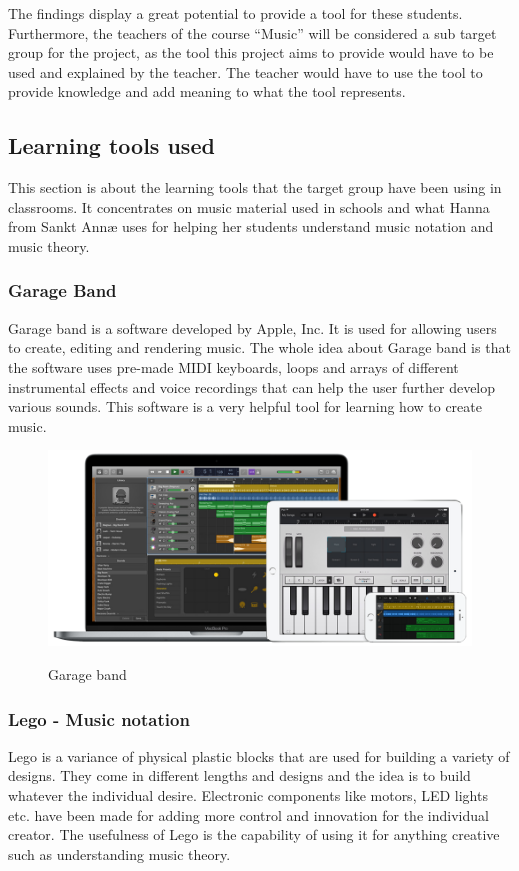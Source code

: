 The findings display a great potential to provide a tool for these students.
Furthermore, the teachers of the course “Music” will be considered a sub target group for the project, as the tool this project aims to provide would have to be used and explained by the teacher. The teacher would have to use the tool to provide knowledge and add meaning to what the tool represents.
 
 
\subsection{Learning tools used}%
This section is about the learning tools that the target group have been using in classrooms. It concentrates on music material used in schools and what Hanna from Sankt Annæ uses for helping her students understand music notation and music theory. 

\subsubsection{Garage Band}
Garage band is a software developed by Apple, Inc. It is used for allowing users to create, editing and rendering music. The whole idea about Garage band is that the software uses pre-made MIDI keyboards, loops and arrays of different instrumental effects and voice recordings that can help the user further develop various sounds. This software is a very helpful tool for learning how to create music.
\begin{figure}[H]
	\centering
	\includegraphics[width=0.7\linewidth]{figure/Analysis/garageband}
	\label{fig:garageband}
	\caption{Garage band}
	
\end{figure}

\subsubsection{Lego - Music notation}
Lego is a variance of physical plastic blocks that are used for building a variety of designs. They come in different lengths and designs and the idea is to build whatever the individual desire. Electronic components like motors, LED lights etc. have been made for adding more control and innovation for the individual creator. The usefulness of Lego is the capability of using it for anything creative such as understanding music theory. 

